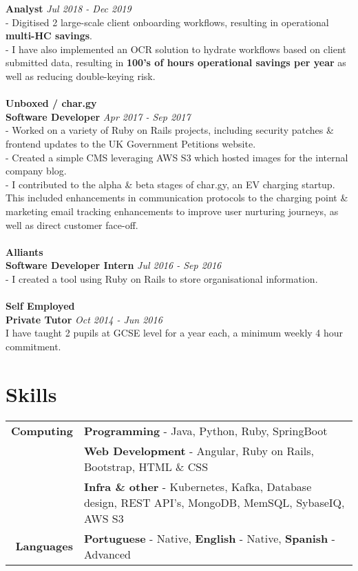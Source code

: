 \documentclass[a4paper,10pt]{article}
\begin{document}
		\textbf{Analyst}  \hfill \textit{Jul 2018 - Dec 2019}
		\\ - Digitised 2 large-scale client onboarding workflows, resulting in operational \textbf{multi-HC savings}. 
		\\ - I have also implemented an OCR solution to hydrate workflows based on client submitted data, resulting in \textbf{100's of hours operational savings per year} as well as reducing double-keying risk.
		\\\\\hfill\textbf{Unboxed / char.gy} 
		\\\textbf{Software Developer} \hfill \textit{Apr 2017 - Sep 2017 }
		\\ - Worked on a variety of Ruby on Rails projects, including security patches \& frontend updates to the UK Government Petitions website. 
		\\ - Created a simple CMS leveraging AWS S3 which hosted images for the internal company blog. 
		\\ - I contributed to the alpha \& beta stages of char.gy, an EV charging startup. This included enhancements in communication protocols to the charging point \& marketing email tracking enhancements to improve user nurturing journeys, as well as direct customer face-off.
		\\\\	
		\textbf{Alliants}
		\\\textbf{Software Developer Intern} \hfill \textit{Jul 2016 - Sep 2016}
		\\ - I created a tool using Ruby on Rails to store organisational information.
		\\\\
		\textbf{Self Employed} 
		\\\textbf{Private Tutor} \hfill \textit{Oct 2014 - Jun 2016 }
		\\ I have taught 2 pupils at GCSE level for a year each, a minimum weekly 4 hour commitment.

		
		

	

	
		\section*{Skills}
	
	\begin{tabular}{r|p{12cm}}	
		\textbf{Computing}	 & \textbf{Programming} - Java, Python, Ruby, SpringBoot  \\&
								\textbf{Web Development} - Angular, Ruby on Rails, Bootstrap, HTML \& CSS \\&
								\textbf{Infra \& other} - Kubernetes, Kafka, Database design, REST API's, MongoDB, MemSQL, SybaseIQ, AWS S3  \\
		\textbf{Languages}   & \textbf{Portuguese} - Native, \textbf{English} - Native, \textbf{Spanish} - Advanced
	\end{tabular}
	
\end{document}
